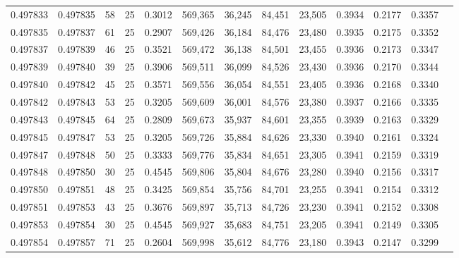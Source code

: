 \begin{tabular}{rrrrrrrrrrrrr}
0.497833 & 0.497835 &    58 &  25 &                                     0.3012 & 569,365 &  36,245 &  84,451 &  23,505 & 0.3934 & 0.2177 & 0.3357 \\
0.497835 & 0.497837 &    61 &  25 &                                     0.2907 & 569,426 &  36,184 &  84,476 &  23,480 & 0.3935 & 0.2175 & 0.3352 \\
0.497837 & 0.497839 &    46 &  25 &                                     0.3521 & 569,472 &  36,138 &  84,501 &  23,455 & 0.3936 & 0.2173 & 0.3347 \\
0.497839 & 0.497840 &    39 &  25 &                                     0.3906 & 569,511 &  36,099 &  84,526 &  23,430 & 0.3936 & 0.2170 & 0.3344 \\
0.497840 & 0.497842 &    45 &  25 &                                     0.3571 & 569,556 &  36,054 &  84,551 &  23,405 & 0.3936 & 0.2168 & 0.3340 \\
0.497842 & 0.497843 &    53 &  25 &                                     0.3205 & 569,609 &  36,001 &  84,576 &  23,380 & 0.3937 & 0.2166 & 0.3335 \\
0.497843 & 0.497845 &    64 &  25 &                                     0.2809 & 569,673 &  35,937 &  84,601 &  23,355 & 0.3939 & 0.2163 & 0.3329 \\
0.497845 & 0.497847 &    53 &  25 &                                     0.3205 & 569,726 &  35,884 &  84,626 &  23,330 & 0.3940 & 0.2161 & 0.3324 \\
0.497847 & 0.497848 &    50 &  25 &                                     0.3333 & 569,776 &  35,834 &  84,651 &  23,305 & 0.3941 & 0.2159 & 0.3319 \\
0.497848 & 0.497850 &    30 &  25 &                                     0.4545 & 569,806 &  35,804 &  84,676 &  23,280 & 0.3940 & 0.2156 & 0.3317 \\
0.497850 & 0.497851 &    48 &  25 &                                     0.3425 & 569,854 &  35,756 &  84,701 &  23,255 & 0.3941 & 0.2154 & 0.3312 \\
0.497851 & 0.497853 &    43 &  25 &                                     0.3676 & 569,897 &  35,713 &  84,726 &  23,230 & 0.3941 & 0.2152 & 0.3308 \\
0.497853 & 0.497854 &    30 &  25 &                                     0.4545 & 569,927 &  35,683 &  84,751 &  23,205 & 0.3941 & 0.2149 & 0.3305 \\
0.497854 & 0.497857 &    71 &  25 &                                     0.2604 & 569,998 &  35,612 &  84,776 &  23,180 & 0.3943 & 0.2147 & 0.3299 \\

\end{tabular}

